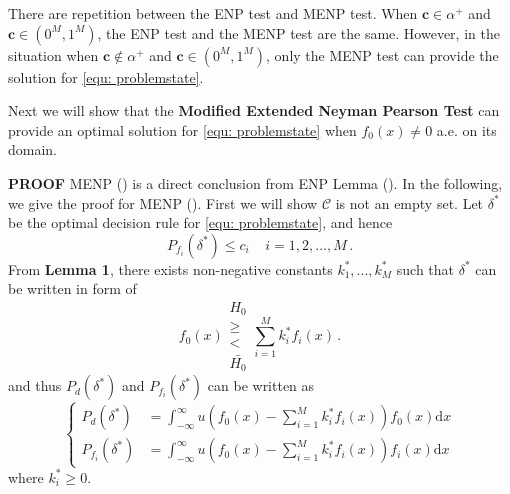 There are repetition between the ENP test and MENP test. When $\mathbf{c} \in   \alpha^+$ and $\mathbf{c} \in (0^M, 1^M)$, the ENP test and the MENP test are the same. However, in the situation when $\mathbf{c} \notin \alpha^+$ and $\mathbf{c} \in (0^M, 1^M)$, only the MENP test can provide the solution for \eqref{equ: problemstate}. 

Next we will show that the \textbf{Modified Extended Neyman Pearson Test} can provide an optimal solution for \eqref{equ: problemstate} when $f_0(x) \neq 0$ a.e. on its domain.

\textbf{PROOF}
MENP () is a direct conclusion from ENP Lemma (). In the following,  we give the proof for MENP (). First we will show $\mathcal{C}$ is not an empty set. 
Let $\delta^\ast$ be the optimal decision rule for \eqref{equ: problemstate}, and hence
\begin{equation}
\label{condition 1}
P_{f_i}(\delta^\ast) \leq c_i\;\;\;\;i=1, 2, ..., M\,.
\end{equation}
From \textbf{Lemma 1}, there exists non-negative constants $k_1^\ast, ..., k_M^\ast$ such that $\delta^\ast$ can be written in form of 
\begin{equation}
f_0(x) \substack{H_0 \\ \geq \\ < \\ \bar{H_0}} \sum_{i=1}^{M}k_i^\ast f_i(x)\,.
\label{2015feb20a1}
\end{equation}
and thus $P_d(\delta^\ast)$ and $P_{f_i}(\delta^\ast)$ can be written as
\begin{equation}
\begin{cases}
\label{TEMP10}
P_{d}(\delta^\ast) &= \int_{-\infty}^{\infty} u(f_0(x) - \sum_{i=1}^{M}k_i^\ast f_i(x)) f_0(x) \mathrm{d}x\\
P_{f_i}(\delta^\ast) &= \int_{-\infty}^{\infty} u(f_0(x) - \sum_{i=1}^{M}k_i^\ast f_i(x)) f_i(x) \mathrm{d}x
\end{cases}
\end{equation}
where $k_i^\ast \geq 0$.

